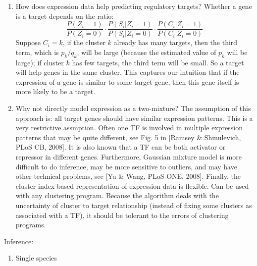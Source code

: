 \documentclass[11pt]{article}
\begin{document}
\begin{enumerate}
\begin{enumerate}
\item How does expression data help predicting regulatory targets? Whether a gene is a target depends on the ratio: 
\begin{equation}
\frac{P(Z_i = 1)}{P(Z_i = 0)} \cdot \frac{P(S_i | Z_i = 1)}{P(S_i | Z_i = 0)} \cdot \frac{P(C_i | Z_i = 1)}{P(C_i | Z_i = 0)}
\end{equation}
Suppose $C_i = k$, if the cluster $k$ already has many targets, then the third term, which is $p_k/q_k$, will be large (because the estimated value of $p_k$ will be large); if cluster $k$ has few targets, the third term will be small. So a target will help genes in the same cluster. This captures our intuition that if the expression of a gene is similar to some target gene, then this gene itself is more likely to be a target. 

\item Why not directly model expression as a two-mixture? The assumption of this approach is: all target genes should have similar expression patterns. This is a very restrictive assmption. Often one TF is involved in multiple expression patterns that may be quite different, see Fig. 5 in [Ramsey \& Shmulevich, PLoS CB, 2008]. It is also known that a TF can be both activator or repressor in different genes. Furthermore, Gaussian mixture model is more difficult to do inference, may be more sensitive to outliers, and may have other technical problems, see [Yu \& Wang, PLoS ONE, 2008]. Finally, the cluster index-based representation of expression data is flexible. Can be used with any clustering program. Because the algorithm deals with the uncertainty of cluster to target relationship (instead of fixing some clusters as associated with a TF), it should be tolerant to the errors of clustering programs. 

\end{enumerate}

Inference: 
\begin{enumerate}

\item{Single species}


\end{enumerate}
\end{enumerate}
\end{document}
